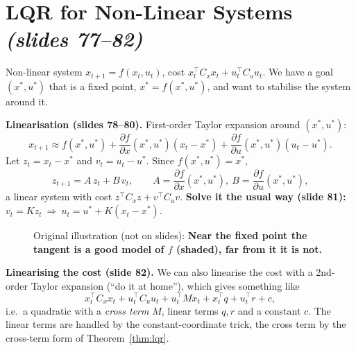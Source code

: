 \documentclass[11pt,a4paper]{article}
\newcommand{\slides}[1]{\emph{(slides #1)}}
\theoremstyle{plain}
\theoremstyle{definition}
\theoremstyle{remark}
\begin{document}
\section{LQR for Non-Linear Systems \slides{77--82}}

Non-linear system $x_{t+1}=f(x_t,u_t)$, cost $x_t^\top C_xx_t+u_t^\top C_uu_t$. We have a goal $(x^*,u^*)$ that is a fixed point, $x^*=f(x^*,u^*)$, and want to stabilise the system around it.

\textbf{Linearisation (slides 78--80).} First-order Taylor expansion around $(x^*,u^*)$:
\[
x_{t+1}\approx f(x^*,u^*)+\frac{\partial f}{\partial x}(x^*,u^*)(x_t-x^*)+\frac{\partial f}{\partial u}(x^*,u^*)(u_t-u^*).
\]
Let $z_t=x_t-x^*$ and $v_t=u_t-u^*$. Since $f(x^*,u^*)=x^*$,
\[
z_{t+1}=A\,z_t+B\,v_t,\qquad A=\frac{\partial f}{\partial x}(x^*,u^*),\ B=\frac{\partial f}{\partial u}(x^*,u^*),
\]
a linear system with cost $z^\top C_xz+v^\top C_uv$. \textbf{Solve it the usual way (slide 81):} $v_t=Kz_t\ \Rightarrow\ u_t=u^*+K(x_t-x^*)$.

\begin{figure}[H]
\centering
{}
\caption{Original illustration (not on slides): \textbf{Near the fixed point the tangent is a good model of $f$ (shaded), far from it it is not.}}
\end{figure}

\textbf{Linearising the cost (slide 82).} We can also linearise the cost with a 2nd-order Taylor expansion (``do it at home''), which gives something like
\[
x_t^\top C_xx_t+u_t^\top C_uu_t+u_t^\top Mx_t+x_t^\top q+u_t^\top r+c,
\]
i.e.\ a quadratic with a \emph{cross term} $M$, linear terms $q,r$ and a constant $c$. The linear terms are handled by the constant-coordinate trick, the cross term by the cross-term form of Theorem~\ref{thm:lqr}.
\end{document}
